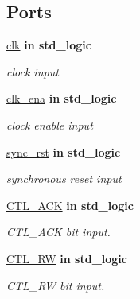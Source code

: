 \subsection*{Ports}
 \begin{DoxyCompactItemize}
\item 
\hyperlink{classi2c__master__engine_a4a4609c199d30b3adebbeb3a01276ec5}{clk}  {\bfseries {\bfseries \textcolor{vhdlchar}{in}\textcolor{vhdlchar}{ }}} {\bfseries \textcolor{vhdlchar}{std\+\_\+logic}\textcolor{vhdlchar}{ }} 
\begin{DoxyCompactList}\small\item\em clock input \end{DoxyCompactList}\item 
\hyperlink{classi2c__master__engine_a373faa4fdd1aebdfb0b95d5d53da4434}{clk\+\_\+ena}  {\bfseries {\bfseries \textcolor{vhdlchar}{in}\textcolor{vhdlchar}{ }}} {\bfseries \textcolor{vhdlchar}{std\+\_\+logic}\textcolor{vhdlchar}{ }} 
\begin{DoxyCompactList}\small\item\em clock enable input \end{DoxyCompactList}\item 
\hyperlink{classi2c__master__engine_acb5ff599d2768c125faacfd9361063eb}{sync\+\_\+rst}  {\bfseries {\bfseries \textcolor{vhdlchar}{in}\textcolor{vhdlchar}{ }}} {\bfseries \textcolor{vhdlchar}{std\+\_\+logic}\textcolor{vhdlchar}{ }} 
\begin{DoxyCompactList}\small\item\em synchronous reset input \end{DoxyCompactList}\item 
\hyperlink{classi2c__master__engine_a074411f95c6b7b20f917fc5793cff2c7}{C\+T\+L\+\_\+\+A\+CK}  {\bfseries {\bfseries \textcolor{vhdlchar}{in}\textcolor{vhdlchar}{ }}} {\bfseries \textcolor{vhdlchar}{std\+\_\+logic}\textcolor{vhdlchar}{ }} 
\begin{DoxyCompactList}\small\item\em C\+T\+L\+\_\+\+A\+CK bit input. \end{DoxyCompactList}\item 
\hyperlink{classi2c__master__engine_ae210ead9f1d4a08ff72ae0b525cea727}{C\+T\+L\+\_\+\+RW}  {\bfseries {\bfseries \textcolor{vhdlchar}{in}\textcolor{vhdlchar}{ }}} {\bfseries \textcolor{vhdlchar}{std\+\_\+logic}\textcolor{vhdlchar}{ }} 
\begin{DoxyCompactList}\small\item\em C\+T\+L\+\_\+\+RW bit input. \end{DoxyCompactList}\item 

\end{DoxyCompactItemize}

